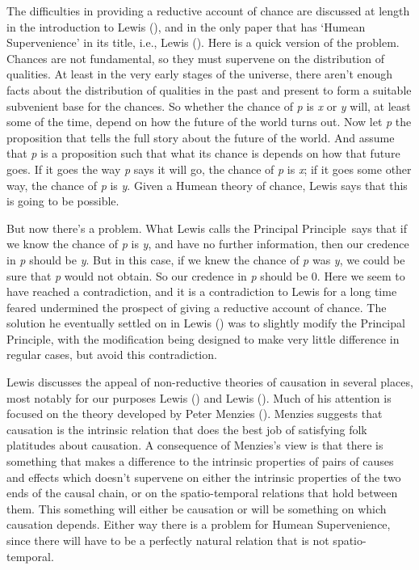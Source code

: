 \documentclass[
  11pt,
  letterpaper,
  DIV=11,
  numbers=noendperiod,
  twoside]{scrartcl}
\begin{document}
The difficulties in providing a reductive account of chance are
discussed at length in the introduction to Lewis
(), and in the only paper that has
`Humean Supervenience' in its title, i.e., Lewis
(). Here is a quick version of the
problem. Chances are not fundamental, so they must supervene on the
distribution of qualities. At least in the very early stages of the
universe, there aren't enough facts about the distribution of qualities
in the past and present to form a suitable subvenient base for the
chances. So whether the chance of \emph{p} is \emph{x} or \emph{y} will,
at least some of the time, depend on how the future of the world turns
out. Now let \emph{p} the proposition that tells the full story about
the future of the world. And assume that \emph{p} is a proposition such
that what its chance is depends on how that future goes. If it goes the
way \emph{p} says it will go, the chance of \emph{p} is \emph{x}; if it
goes some other way, the chance of \emph{p} is \emph{y}. Given a Humean
theory of chance, Lewis says that this is going to be possible.

But now there's a problem. What Lewis calls the Principal Principle~says
that if we know the chance of \emph{p} is \emph{y}, and have no further
information, then our credence in \emph{p} should be \emph{y}. But in
this case, if we knew the chance of \emph{p} was \emph{y}, we could be
sure that \emph{p} would not obtain. So our credence in \emph{p} should
be 0. Here we seem to have reached a contradiction, and it is a
contradiction to Lewis for a long time feared undermined the prospect of
giving a reductive account of chance. The solution he eventually settled
on in Lewis () was to slightly modify
the Principal Principle, with the modification being designed to make
very little difference in regular cases, but avoid this contradiction.

Lewis discusses the appeal of non-reductive theories of causation in
several places, most notably for our purposes Lewis
() and Lewis
(). Much of his attention is focused on
the theory developed by Peter Menzies
(). Menzies suggests that causation is
the intrinsic relation that does the best job of satisfying folk
platitudes about causation. A consequence of Menzies's view is that
there is something that makes a difference to the intrinsic properties
of pairs of causes and effects which doesn't supervene on either the
intrinsic properties of the two ends of the causal chain, or on the
spatio-temporal relations that hold between them. This something will
either be causation or will be something on which causation depends.
Either way there is a problem for Humean Supervenience, since there will
have to be a perfectly natural relation that is not spatio-temporal.
\end{document}
